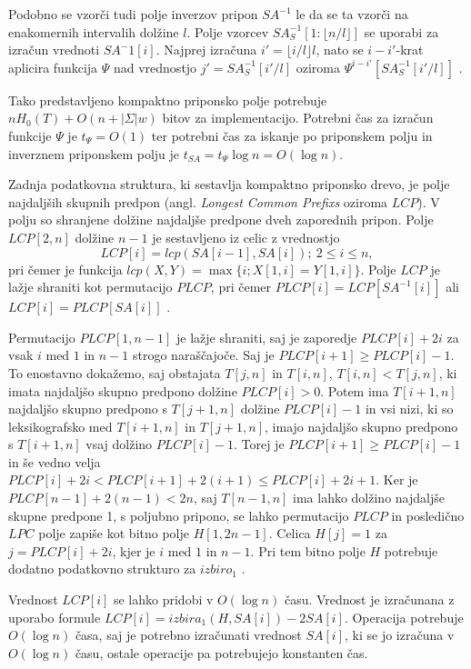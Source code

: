 Podobno se vzorči tudi polje inverzov pripon $SA^{-1}$ le da se ta vzorči na enakomernih intervalih dolžine $l$. Polje vzorcev $SA^{-1}_S[1:\lfloor n/l\rfloor]$ se uporabi za izračun vrednoti $SA^-1[i]$. Najprej izračuna $i'=\lfloor i/l\rfloor l$, nato se $i-i'$-krat aplicira funkcija $\Psi$ nad vrednostjo $j'=SA^{-1}_S[i'/l]$ oziroma $\Psi^{i-i'}[SA^{-1}_S[i'/l]]$ \cite{Navarro2016}.

Tako predstavljeno kompaktno priponsko polje potrebuje $nH_0(T)+O(n+|\Sigma|w)$ bitov za implementacijo. Potrebni čas za izračun funkcije $\Psi$ je $t_\Psi=O(1)$ ter potrebni čas za iskanje po priponskem polju in inverznem priponskem polju je $t_{SA}=t_\Psi \log{n} = O( \log{n})$.

Zadnja podatkovna struktura, ki sestavlja kompaktno priponsko drevo, je polje najdaljših skupnih predpon (angl. \textit{Longest Common Prefixs} oziroma $LCP$). V polju so shranjene dolžine najdaljše predpone dveh zaporednih pripon. Polje $LCP[2,n]$ dolžine $n-1$ je sestavljeno iz celic z vrednostjo
$$
    LCP[i]=lcp(SA[i-1],SA[i]);\:2\le i\le n,
$$
pri čemer je funkcija $lcp(X,Y)=\max\{i;X[1,i]=Y[1,i]\}$. Polje $LCP$ je lažje shraniti kot permutacijo $PLCP$, pri čemer $PLCP[i]=LCP[SA^{-1}[i]]$ ali $LCP[i]=PLCP[SA[i]]$  \cite{Navarro2016}.


Permutacijo $PLCP[1,n-1]$ je lažje shraniti, saj je zaporedje $PLCP[i]+2i$ za vsak $i$ med $1$ in $n-1$ strogo naraščajoče. Saj je $PLCP[i+1]\ge PLCP[i]-1$. To enostavno dokažemo, saj obstajata $T[j,n]$ in $T[i,n]$, $T[i,n]<T[j,n]$, ki imata najdaljšo skupno predpono dolžine $PLCP[i]>0$. Potem ima $T[i+1,n]$ najdaljšo skupno predpono s $T[j+1,n]$ dolžine $PLCP[i]-1$ in vsi nizi, ki so leksikografsko med $T[i+1,n]$ in $T[j+1,n]$, imajo najdaljšo skupno predpono s $T[i+1,n]$ vsaj dolžino $PLCP[i]-1$. Torej je $PLCP[i+1]\ge PLCP[i]-1$ in še vedno velja $PLCP[i]+2i<PLCP[i+1]+2(i+1)\le PLCP[i]+2i+1$. Ker je $PLCP[n-1]+2(n-1)< 2n$, saj $T[n-1,n]$ ima lahko dolžino najdaljše skupne predpone 1, s poljubno pripono, se lahko permutacijo $PLCP$ in posledično $LPC$ polje zapiše kot bitno polje $H[1,2n-1]$. Celica $H[j]=1$ za $j=PLCP[i]+2i$, kjer je $i$ med $1$ in $n-1$. Pri tem bitno polje $H$ potrebuje dodatno podatkovno strukturo za $izbiro_1$ \cite{Navarro2016}.

Vrednost $LCP[i]$ se lahko pridobi v $O(\log{n})$ času. Vrednost je izračunana z uporabo formule $LCP[i]=izbira_1(H,SA[i])-2SA[i]$. Operacija potrebuje $O(\log{n})$ časa, saj je potrebno izračunati vrednost $SA[i]$, ki se jo izračuna v $O(\log{n})$ času, ostale operacije pa potrebujejo konstanten čas. 


